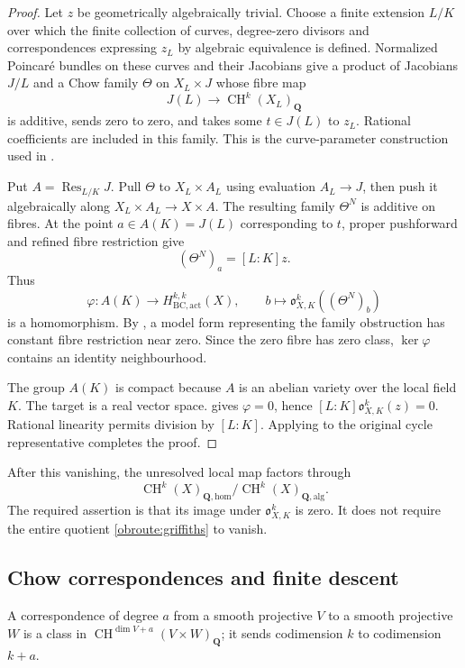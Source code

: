 \documentclass[11pt,a4paper]{article}
\theoremstyle{definition}
\numberwithin{equation}{section}
\newcommand{\CH}{\operatorname{CH}}
\newcommand{\Ob}{\mathfrak o}
\newcommand{\homol}{\mathrm{hom}}
\newcommand{\alg}{\mathrm{alg}}
\newcommand{\Q}{\mathbf Q}
\newcommand{\Res}{\operatorname{Res}}
\begin{document}
\begin{proof}
Let $z$ be geometrically algebraically trivial. Choose a finite extension $L/K$ over which the finite collection of curves, degree-zero divisors and correspondences expressing $z_L$ by algebraic equivalence is defined. Normalized Poincar\'e bundles on these curves and their Jacobians give a product of Jacobians $J/L$ and a Chow family $\Theta$ on $X_L\times J$ whose fibre map
\[
 J(L)\longrightarrow\CH^k(X_L)_\Q
\]
is additive, sends zero to zero, and takes some $t\in J(L)$ to $z_L$. Rational coefficients are included in this family. This is the curve-parameter construction used in \cite[Section 9.1]{Local}.

Put $A=\Res_{L/K}J$. Pull $\Theta$ to $X_L\times A_L$ using evaluation $A_L\to J$, then push it algebraically along $X_L\times A_L\to X\times A$. The resulting family $\Theta^N$ is additive on fibres. At the point $a\in A(K)=J(L)$ corresponding to $t$, proper pushforward and refined fibre restriction give
\[
 (\Theta^N)_a=[L:K]z.
\]
Thus
\[
 \varphi:A(K)\longrightarrow H^{k,k}_{\mathrm{BC,act}}(X),
 \qquad b\longmapsto\Ob^k_{X,K}((\Theta^N)_b)
\]
is a homomorphism. By , a model form representing the family obstruction has constant fibre restriction near zero. Since the zero fibre has zero class, $\ker\varphi$ contains an identity neighbourhood.

The group $A(K)$ is compact because $A$ is an abelian variety over the local field $K$. The target is a real vector space.  gives $\varphi=0$, hence $[L:K]\Ob^k_{X,K}(z)=0$. Rational linearity permits division by $[L:K]$. Applying  to the original cycle representative completes the proof.
\end{proof}

After this vanishing, the unresolved local map factors through
\begin{equation}\label{obroute:griffiths}
 \CH^k(X)_{\Q,\homol}/\CH^k(X)_{\Q,\alg}.
\end{equation}
The required assertion is that its image under $\Ob^k_{X,K}$ is zero. It does not require the entire quotient \eqref{obroute:griffiths} to vanish.

\subsection{Chow correspondences and finite descent}\label{obroute:correspondences}

A correspondence of degree $a$ from a smooth projective $V$ to a smooth projective $W$ is a class in $\CH^{\dim V+a}(V\times W)_\Q$; it sends codimension $k$ to codimension $k+a$.
\end{document}

